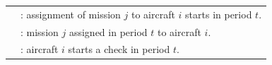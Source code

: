
\begin{frame}
\frametitle{\textbf{\firsttitleF}}
  \begin{tabular}{ll}
    \onslide<+->{
      $a^s_{ijt}$ &  : assignment of mission $j$ to aircraft $i$ starts in period $t$.
    }  \\
    \onslide<+->{
      $a_{ijt}$ &  :  mission $j$ assigned in period $t$ to aircraft $i$.
    }  \\
    \onslide<4->{
      $m_{it}$   & :  aircraft $i$ starts a check in period $t$.
    }
  \end{tabular}

  

\end{frame}

